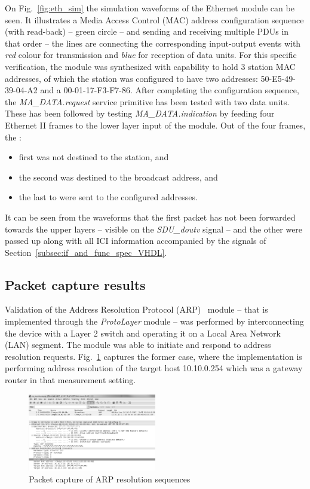 \documentclass[journal]{IEEEtran}
\begin{document}
On Fig.~\ref{fig:eth_sim} the simulation waveforms of the Ethernet module can be seen. It illustrates a Media Access Control (MAC) address
configuration sequence (with read-back) -- green circle -- and sending and receiving multiple PDUs in that order -- the
lines are connecting the corresponding input-output events with \emph{red} colour for transmission and \emph{blue} for
reception of data units. For this specific verification, the module was synthesized with capability to hold 3 station
MAC addresses, of which the station was configured to have two addresses: 50-E5-49-39-04-A2 and a 00-01-17-F3-F7-86.
After completing the configuration sequence, the \emph{MA\_DATA.request} service primitive has been tested with two
data units. These has been followed by testing \emph{MA\_DATA.indication} by feeding four Ethernet II frames to the
lower layer input of the module. Out of the four frames, the :
\begin{itemize}
    \item first was not destined to the station, and
    \item the second was destined to the broadcast address, and
    \item the last to were sent to the configured addresses.
\end{itemize}
It can be seen from the waveforms that the first packet has not been forwarded towards the upper layers -- visible on
the \emph{SDU\_doutv} signal -- and the other were passed up along with all ICI information accompanied by the signals
of Section~\ref{subsec:if_and_func_spec_VHDL}.

\subsection{Packet capture results}

Validation of the Address Resolution Protocol (ARP)~\cite{RFC0826-ARP} module -- that is implemented through the \emph{ProtoLayer} module
-- was performed by interconnecting the device with a Layer 2 switch and operating it on a Local Area Network (LAN) segment. The module was
able to initiate and respond to address resolution requests. Fig.~\ref{fig:pcap_arp_seq} captures the former case,
where the implementation is performing address resolution of the target host 10.10.0.254 which was a gateway router in
that measurement setting.

\begin{figure}[!htb]
    \centering
    \includegraphics[width=0.5\textwidth]{figures_raw/arp_transaction.png}
    \caption{Packet capture of ARP resolution sequences}
    \label{fig:pcap_arp_seq}
\end{figure}
\end{document}
